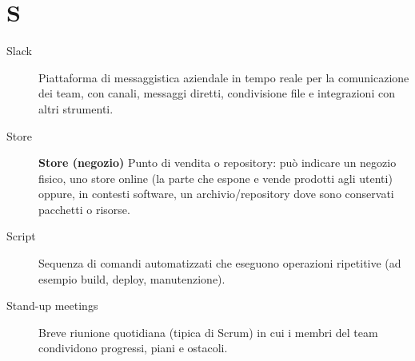 \section*{S}
\begin{description}
    \item[Slack] Piattaforma di messaggistica aziendale in tempo reale per la comunicazione dei team, con canali, messaggi diretti, condivisione file e integrazioni con altri strumenti.
    \item[Store] \textbf{Store (negozio)} Punto di vendita o repository: può indicare un negozio fisico, uno store online (la parte che espone e vende prodotti agli utenti) oppure, in contesti software, un archivio/repository dove sono conservati pacchetti o risorse.
    \item[Script] Sequenza di comandi automatizzati che eseguono operazioni ripetitive (ad esempio build, deploy, manutenzione).
    \item[Stand-up meetings] Breve riunione quotidiana (tipica di Scrum) in cui i membri del team condividono progressi, piani e ostacoli.
\end{description}

